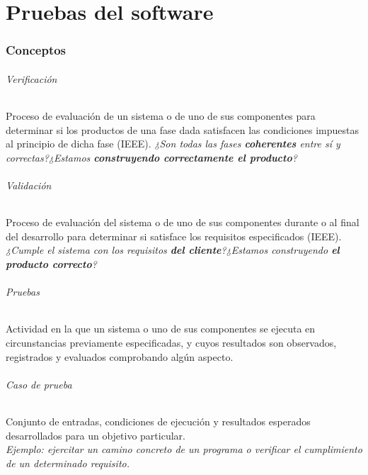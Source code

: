 \part{Pruebas del software}
\section{Conceptos} %

\paragraph{Verificación} Proceso de evaluación de un sistema o de uno de sus componentes para determinar si los productos de una fase dada satisfacen las condiciones impuestas al principio de dicha fase (IEEE). \textit{¿Son todas las fases \textbf{coherentes} entre sí y correctas?¿Estamos \textbf{construyendo correctamente el producto}?}

\paragraph{Validación} Proceso de evaluación del sistema o de uno de sus componentes durante o al final del desarrollo para determinar si satisface los requisitos especificados (IEEE). \textit{¿Cumple el sistema con los requisitos \textbf{del cliente}?¿Estamos construyendo \textbf{el producto correcto}?}


\paragraph{Pruebas} Actividad en la que un sistema o uno de sus componentes se ejecuta en circunstancias previamente especificadas, y cuyos resultados son observados, registrados y evaluados comprobando algún aspecto.
\paragraph{Caso de prueba} Conjunto de entradas, condiciones de ejecución y resultados esperados desarrollados para un objetivo particular.\\\textit{Ejemplo: ejercitar un camino concreto de un programa o verificar el cumplimiento de un determinado requisito.} %

